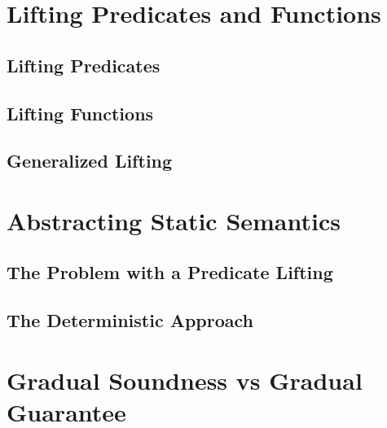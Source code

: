 \section{Lifting Predicates and Functions}
\label{sec:lifting-predicates-and}


    \subsection{Lifting Predicates}
    \label{ssec:lifting-predicates}
    
    
    \subsection{Lifting Functions}
    \label{ssec:lifting-functions}
    
    
    \subsection{Generalized Lifting}
    \label{ssec:generalized-lifting}
    

\section{Abstracting Static Semantics}
\label{sec:abstracting-static-semantics}

    
    \subsection{The Problem with a Predicate Lifting}
    \label{ssec:the-problem-with}
    
    
    \subsection{The Deterministic Approach}
    \label{ssec:the-deterministic-approach}
    
    
    \section{Gradual Soundness vs Gradual Guarantee}
    \label{ssec:gradual-soundness}
    

